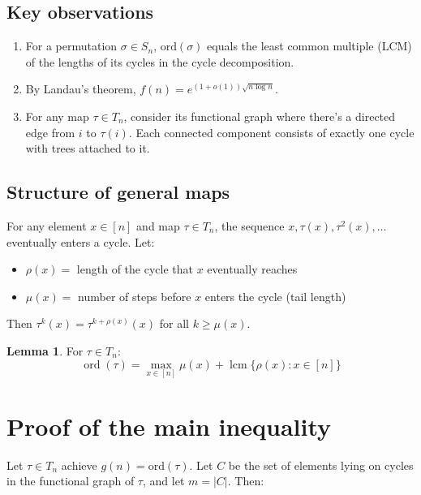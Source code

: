 \documentclass[12pt,a4paper]{article}
\theoremstyle{definition}
\newtheorem{lemma}{Lemma}
\begin{document}
        \subsection*{Key observations}

        \begin{enumerate}
            \item For a permutation $\sigma \in S_n$, $\text{ord}(\sigma)$ equals the least common multiple (LCM) of the lengths of its cycles in the cycle decomposition.

            \item By Landau's theorem, $f(n) = e^{(1+o(1))\sqrt{n \log n}}$.

            \item For any map $\tau \in T_n$, consider its functional graph where there's a directed edge from $i$ to $\tau(i)$. Each connected component consists of exactly one cycle with trees attached to it.
        \end{enumerate}

        \subsection*{Structure of general maps}

        For any element $x \in [n]$ and map $\tau \in T_n$, the sequence $x, \tau(x), \tau^2(x), \ldots$ eventually enters a cycle. Let:
        \begin{itemize}
            \item $\rho(x) =$ length of the cycle that $x$ eventually reaches
            \item $\mu(x) =$ number of steps before $x$ enters the cycle (tail length)
        \end{itemize}

        Then $\tau^k(x) = \tau^{k+\rho(x)}(x)$ for all $k \geq \mu(x)$.

        \begin{lemma}
            For $\tau \in T_n$:
            $$\operatorname{ord}(\tau) = \max_{x \in [n]} \mu(x) + \operatorname{lcm}\{\rho(x) : x \in [n]\}$$
        \end{lemma}

        \section*{Proof of the main inequality}

        Let $\tau \in T_n$ achieve $g(n) = \text{ord}(\tau)$. Let $C$ be the set of elements lying on cycles in the functional graph of $\tau$, and let $m = |C|$. Then:
\end{document}
